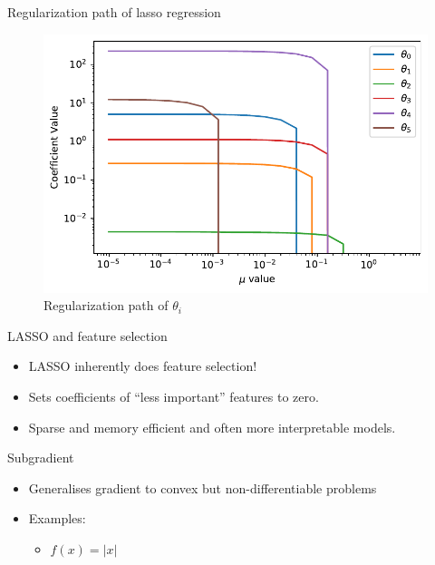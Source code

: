 \documentclass{beamer}
\begin{document}
\begin{frame}{Regularization path of lasso regression}
\begin{figure}
    \centering
    \includegraphics[scale = 0.5]{../assets/lasso/figures/lasso_reg.pdf}
    \caption{Regularization path of $\theta_{i}$}
    \label{fig:my_label}
\end{figure}

\end{frame}


\begin{frame}{LASSO and feature selection}
\begin{itemize}[<+->]
	\item LASSO inherently does feature selection!
	\item Sets coefficients of ``less important'' features to zero.
	\item Sparse and memory efficient and often more interpretable models.
\end{itemize}
\end{frame}

\begin{frame}{Subgradient }
\begin{itemize}
	
	
	\item Generalises gradient to convex but non-differentiable problems
	\item Examples:
	\begin{itemize}
		\item $f(x) = |x|$
	\end{itemize}
	
\end{itemize}
\end{frame}
\end{document}
